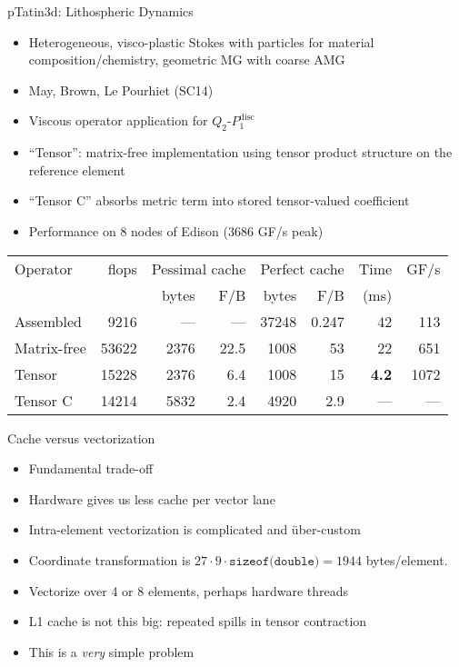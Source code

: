 \documentclass{beamer}
\begin{document}
\begin{frame}{pTatin3d: Lithospheric Dynamics}
  \begin{itemize}
  \item Heterogeneous, visco-plastic Stokes with particles for material composition/chemistry, geometric MG with coarse AMG
  \item May, Brown, Le Pourhiet (SC14)
  \item Viscous operator application for $Q_2$-$P_1^{\text{disc}}$
  \item ``Tensor'': matrix-free implementation using tensor product structure on the reference element
  \item ``Tensor C'' absorbs metric term into stored tensor-valued coefficient
  \item Performance on 8 nodes of Edison (3686 GF/s peak)
  \end{itemize}
  \begin{tabular}{lrrrrrrr}
    \toprule
    Operator & flops & \multicolumn{2}{c}{Pessimal cache} & \multicolumn{2}{c}{Perfect cache} & Time & GF/s \\
    & & bytes & F/B & bytes & F/B & (ms) & \\
    \midrule
    Assembled & 9216 & --- & --- &  37248 & 0.247 & 42 & 113 \\
    Matrix-free & 53622 & 2376 & 22.5 & 1008 & 53 & 22 & 651 \\
    Tensor & 15228 & 2376 & 6.4 & 1008 & 15 & {\bf 4.2} & 1072 \\
    Tensor C & 14214 & 5832 & 2.4 & 4920 & 2.9 & --- & --- \\
    \bottomrule
  \end{tabular}
\end{frame}

\begin{frame}{Cache versus vectorization}
  \begin{itemize}
  \item Fundamental trade-off
  \item Hardware gives us less cache per vector lane
  \item Intra-element vectorization is complicated and \"uber-custom
  \item Coordinate transformation is $27\cdot 9\cdot \texttt{sizeof(double)} = 1944$ bytes/element.
  \item Vectorize over 4 or 8 elements, perhaps hardware threads
  \item L1 cache is not this big: repeated spills in tensor contraction
  \item This is a \emph{very} simple problem
  \end{itemize}
\end{frame}
\end{document}
